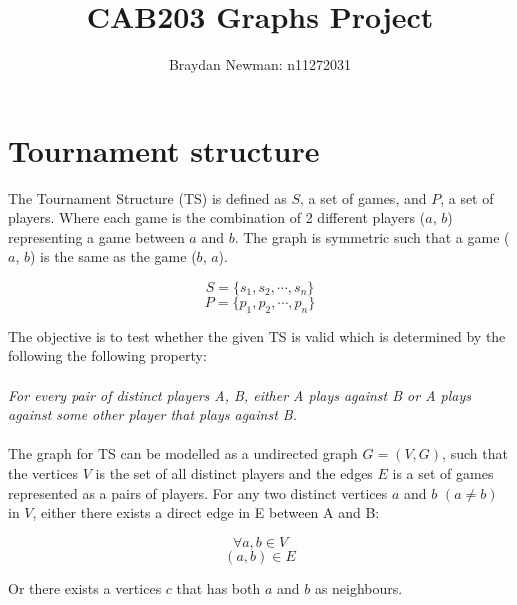 \documentclass[a4paper]{article}
\author{Braydan Newman: n11272031}
\title{CAB203 Graphs Project}
\begin{document}
\maketitle

\section{Tournament structure}\label{sec:tournament-structure}
The Tournament Structure (TS) is defined as $S$, a set of games, and $P$, a set of players. Where each game is the combination of 2 different players ($a$, $b$) representing a game between $a$ and $b$. The graph is symmetric such that a game ($a$, $b$) is the same as the game ($b$, $a$).
\begin{center}
\begin{Large}
\begin{equation}\label{eq:E}
    S = \{s_1, s_2, \cdots, s_n\}
\end{equation}
\begin{equation}\label{eq:P}
    P = \{p_1, p_2, \cdots, p_n\}
\end{equation}
\end{Large}
\end{center}
The objective is to test whether the given TS is valid which is determined by the following the following property:
\\\\
\emph{
For every pair of distinct players A, B, 
either A plays against B 
or A plays against some other player that plays against B.
}
\\\\
The graph for TS can be modelled as a undirected graph $G = (V, G)$, such that the vertices $V$ is the set of all distinct players and the edges $E$ is a set of games represented as a pairs of players. For any two distinct vertices $a$ and $b$ $(a \neq b)$ in $V$, either there exists a direct edge in E between A and B:
\begin{center}
\begin{Large}
\begin{equation}\label{eq:a,b}
    \forall a, b \in V
\end{equation}
\begin{equation}\label{eq:(a,b)}
    (a, b) \in E
\end{equation}


\end{Large}
\end{center}
Or there exists a vertices $c$ that has both $a$ and $b$ as neighbours.
\end{document}
